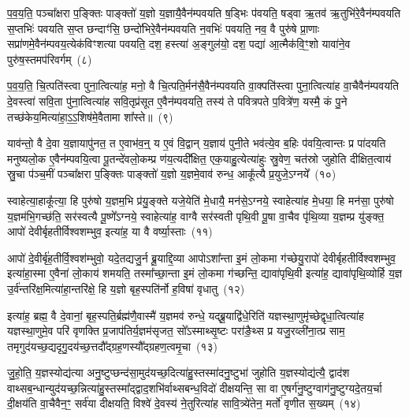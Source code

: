 प॒व॒य॒ति॒ पञ्चा᳚क्षरा प॒ङ्क्तिः पाङ्क्तो॑ य॒ज्ञो य॒ज्ञायै॒वैन॑म्पवयति ष॒ड्भिः प॑वयति॒ षड्वा ऋ॒तव॑ ऋ॒तुभि॑रे॒वैन॑म्पवयति स॒प्तभिः॑ पवयति स॒प्त छन्दाꣳ॑सि॒ छन्दो॑भिरे॒वैन॑म्पवयति न॒वभिः॑ पवयति॒ नव॒ वै पुरु॑षे प्रा॒णाः सप्रा॑णमे॒वैन॑म्पव\-य॒त्येक॑विꣳशत्या पवयति॒ दश॒ हस्त्या॑ अ॒ङ्गुल॑यो॒ दश॒ पद्या॑ आ॒त्मैक॑वि॒ꣳ॒शो यावा॑ने॒व पुरु॑ष॒स्तमप॑रिवर्गम्~(८)

प॒व॒य॒ति॒ चि॒त्पति॑स्त्वा पुना॒त्वित्या॑ह॒ मनो॒ वै चि॒त्पति॒र्मन॑सै॒वैन॑म्पवयति वा॒क्पति॑स्त्वा पुना॒त्वित्या॑ह वा॒चैवैन॑म्पवयति दे॒वस्त्वा॑ सवि॒ता पु॑ना॒त्वित्या॑ह सवि॒तृप्र॑सूत ए॒वैन॑म्पवयति॒ तस्य॑ ते पवित्रपते प॒वित्रे॑ण॒ यस्मै॒ कं पु॒ने तच्छ॑केय॒मित्या॑हा॒ऽ॒ऽ॒शिष॑मे॒वैतामा शा᳚स्ते॥~(९)

{}%

याव॑न्तो॒ वै दे॒वा य॒ज्ञायापु॑नत॒ त ए॒वाभ॑व॒न्॒ य ए॒वं वि॒द्वान् य॒ज्ञाय॑ पुनी॒ते भव॑त्ये॒व ब॒हिः प॑वयि॒त्वान्तः प्र पा॑दयति मनुष्यलो॒क ए॒वैन॑म्पवयि॒त्वा पू॒तन्दे॑वलो॒कम्प्र ण॑य॒त्यदी᳚क्षित॒ एक॒याहु॒त्येत्या॑हुः स्रु॒वेण॒ चत॑स्रो जुहोति दीक्षित॒त्वाय॑ स्रु॒चा प॑ञ्च॒मीं पञ्चा᳚क्षरा प॒ङ्क्तिः पाङ्क्तो॑ य॒ज्ञो य॒ज्ञमे॒वाव॑ रुन्ध॒ आकू᳚त्यै प्र॒युजे॒\-ऽग्नये᳚~(१०)

स्वाहेत्या॒हाकू᳚त्या॒ हि पुरु॑षो य॒ज्ञम॒भि प्र॑यु॒ङ्क्ते यजे॒येति॑ मे॒धायै॒ मन॑से॒\-ऽग्नये॒ स्वाहेत्या॑ह मे॒धया॒ हि मन॑सा॒ पुरु॑षो य॒ज्ञम॑भि॒गच्छ॑ति॒ सर॑स्वत्यै पू॒ष्णे᳚\-ऽग्नये॒ स्वाहेत्या॑ह॒ वाग्वै सर॑स्वती पृथि॒वी पू॒षा वा॒चैव पृ॑थि॒व्या य॒ज्ञम्प्र यु॑ङ्क्त॒ आपो॑ देवीर्बृहतीर्विश्वशम्भुव॒ इत्या॑ह॒ या वै वर्ष्या॒स्ताः~(११)

आपो॑ दे॒वीर्बृ॑ह॒तीर्वि॒श्वश॑म्भुवो॒ यदे॒तद्यजु॒र्न ब्रू॒याद्दि॒व्या आपो\-ऽशा᳚न्ता इ॒मं लो॒कमा ग॑च्छेयु॒रापो॑ देवीर्बृहतीर्विश्वशम्भुव॒ इत्या॑हा॒स्मा ए॒वैना॑ लो॒काय॑ शमयति॒ तस्मा᳚च्छा॒न्ता इ॒मं लो॒कमा ग॑च्छन्ति॒ द्यावा॑पृथि॒वी इत्या॑ह॒ द्यावा॑पृथि॒व्योर्\mbox{}हि य॒ज्ञ उ॒र्व॑न्तरि॑क्ष॒मित्या॑हा॒न्तरि॑क्षे॒ हि य॒ज्ञो बृह॒स्पति॑र्नो ह॒विषा॑ वृधातु~(१२)

इत्या॑ह॒ ब्रह्म॒ वै दे॒वानां॒ बृह॒स्पति॒र्ब्रह्म॑णै॒वास्मै॑ य॒ज्ञमव॑ रुन्धे॒ यद्ब्रू॒याद्वि॑धे॒रिति॑ यज्ञस्था॒णुमृ॑च्छेद्वृधा॒त्वित्या॑ह यज्ञस्था॒णुमे॒व परि॑ वृणक्ति प्र॒जा\-प॑तिर्य॒ज्ञम॑सृजत॒ सो᳚\-ऽस्माथ्सृ॒ष्टः परा॑ङै॒थ्स प्र यजु॒रव्ली॑ना॒त्प्र साम॒ तमृगुद॑यच्छ॒द्यदृगु॒दय॑च्छ॒त्तदौ᳚द्ग्रह॒णस्यौ᳚द्ग्रहण॒त्वमृ॒चा~(१३)

जु॒हो॒ति॒ य॒ज्ञस्योद्य॑त्या अनु॒ष्टुप्छन्द॑सा॒मुद॑यच्छ॒दित्या॑हु॒स्तस्मा॑दनु॒ष्टुभा॑ जुहोति य॒ज्ञस्योद्य॑त्यै॒ द्वाद॑श वाथ्सब॒न्धान्युद॑यच्छ॒न्नित्या॑हु॒स्तस्मा᳚द्द्वाद॒शभि॑र्वाथ्सबन्ध॒विदो॑ दीक्षयन्ति॒ सा वा ए॒षर्ग॑नु॒ष्टुग्वाग॑नु॒ष्टुग्यदे॒तय॒र्चा दी॒क्षय॑ति वा॒चैवैन॒ꣳ॒ सर्व॑या दीक्षयति॒ विश्वे॑ दे॒वस्य॑ ने॒तुरित्या॑ह सावि॒त्र्ये॑तेन॒ मर्तो॑ वृणीत स॒ख्यम्~(१४)

